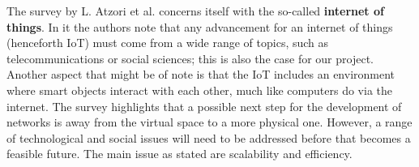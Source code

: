 The survey by L. Atzori et al. \cite{atzori2010internet} concerns itself with the so-called \textbf{internet of things}.
In it the authors note that any advancement for an internet of things (henceforth IoT) must come from a wide range of topics, such as telecommunications or social sciences; this is also the case for our project.
Another aspect that might be of note is that the IoT includes an environment where smart objects interact with each other, much like computers do via the internet.
The survey highlights that a possible next step for the development of networks is away from the virtual space to a more physical one.
However, a range of technological and social issues will need to be addressed before that becomes a feasible future.
The main issue as stated are scalability and efficiency.

